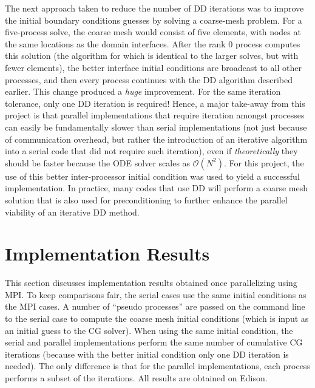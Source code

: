 \documentclass[10pt]{article}
\begin{document}
The next approach taken to reduce the number of DD iterations was to improve the initial boundary conditions guesses by solving a coarse-mesh problem. For a five-process solve, the coarse mesh would consist of five elements, with nodes at the same locations as the domain interfaces. After the rank 0 process computes this solution (the algorithm for which is identical to the larger solves, but with fewer elements), the better interface initial conditions are broadcast to all other processes, and then every process continues with the DD algorithm described earlier. This change produced a {\it huge} improvement. For the same iteration tolerance, only one DD iteration is required! Hence, a major take-away from this project is that parallel implementations that require iteration amongst processes can easily be fundamentally slower than serial implementations (not just because of communication overhead, but rather the introduction of an iterative algorithm into a serial code that did not require such iteration), even if {\it theoretically} they should be faster because the ODE solver scales as \(\mathscr{O}(N^2)\). For this project, the use of this better inter-processor initial condition was used to yield a successful implementation. In practice, many codes that use DD will perform a coarse mesh solution that is also used for preconditioning to further enhance the parallel viability of an iterative DD method.

\section{Implementation Results}
This section discusses implementation results obtained once parallelizing using MPI. To keep comparisons fair, the serial cases use the same initial conditions as the MPI cases. A number of ``pseudo processes'' are passed on the command line to the serial case to compute the coarse mesh initial conditions (which is input as an initial guess to the CG solver). When using the same initial condition, the serial and parallel implementations perform the same number of cumulative CG iterations (because with the better initial condition only one DD iteration is needed). The only difference is that for the parallel implementations, each process performs a subset of the iterations. All results are obtained on Edison.
\end{document}
